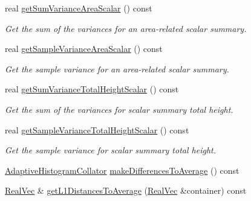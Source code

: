 \begin{DoxyCompactItemize}
real \hyperlink{classsubpavings_1_1AdaptiveHistogramCollator_a46980f85ee8842fc66fd5e2db8aab12e}{get\-Sum\-Variance\-Area\-Scalar} () const 
\begin{DoxyCompactList}\small\item\em \-Get the sum of the variances for an area-\/related scalar summary. \end{DoxyCompactList}\item 
real \hyperlink{classsubpavings_1_1AdaptiveHistogramCollator_aefbffc32c2919a65a8a8f67b74416766}{get\-Sample\-Variance\-Area\-Scalar} () const 
\begin{DoxyCompactList}\small\item\em \-Get the sample variance for an area-\/related scalar summary. \end{DoxyCompactList}\item 
real \hyperlink{classsubpavings_1_1AdaptiveHistogramCollator_af968e5158500b2413e4c4075cdcd15b2}{get\-Sum\-Variance\-Total\-Height\-Scalar} () const 
\begin{DoxyCompactList}\small\item\em \-Get the sum of the variances for scalar summary total height. \end{DoxyCompactList}\item 
real \hyperlink{classsubpavings_1_1AdaptiveHistogramCollator_a0a561a7f838b46985865c6fea1593829}{get\-Sample\-Variance\-Total\-Height\-Scalar} () const 
\begin{DoxyCompactList}\small\item\em \-Get the sample variance for scalar summary total height. \end{DoxyCompactList}\item 
\hyperlink{classsubpavings_1_1AdaptiveHistogramCollator}{\-Adaptive\-Histogram\-Collator} \hyperlink{classsubpavings_1_1AdaptiveHistogramCollator_a123342d0bc1e6b05ef6c8ed32eb3cff7}{make\-Differences\-To\-Average} () const 
\item 
\hyperlink{namespacesubpavings_af2d57bb6e12f4a73169f2e496d6a641f}{\-Real\-Vec} \& \hyperlink{classsubpavings_1_1AdaptiveHistogramCollator_a2b77dad7572df40d94ed62868834f3ae}{get\-L1\-Distances\-To\-Average} (\hyperlink{namespacesubpavings_af2d57bb6e12f4a73169f2e496d6a641f}{\-Real\-Vec} \&container) const 
\end{DoxyCompactItemize}
